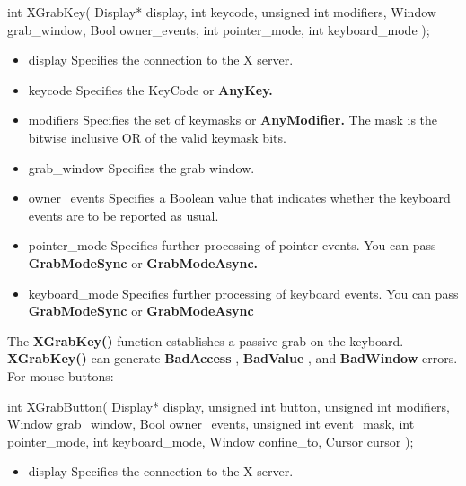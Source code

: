 \documentclass{report}
\begin{document}
\begin{itemize}
\begin{cppcode}
                int XGrabKey(
                    Display* display,
                    int keycode,
                    unsigned int modifiers,
                    Window grab_window,
                    Bool owner_events,
                    int pointer_mode,
                    int keyboard_mode
                );
            \end{cppcode}
            \begin{itemize}
                \item display	Specifies the connection to the X server.
                \item keycode	Specifies the KeyCode or \textbf{AnyKey.}
                \item modifiers	Specifies the set of keymasks or \textbf{AnyModifier.} The mask is the bitwise inclusive OR of the valid keymask bits.
                \item grab\_window	Specifies the grab window.
                \item owner\_events	Specifies a Boolean value that indicates whether the keyboard events are to be reported as usual.
                \item pointer\_mode	Specifies further processing of pointer events. You can pass \textbf{GrabModeSync} or \textbf{GrabModeAsync.}
                \item keyboard\_mode	Specifies further processing of keyboard events. You can pass \textbf{GrabModeSync} or \textbf{GrabModeAsync}
            \end{itemize}
            The \textbf{XGrabKey()} function establishes a passive grab on the keyboard. \textbf{XGrabKey()} can generate \textbf{BadAccess} , \textbf{BadValue} , and \textbf{BadWindow} errors.
            \bigbreak \noindent 
            For mouse buttons:
            \bigbreak \noindent 
            \begin{cppcode}
                int XGrabButton(
                    Display* display,
                    unsigned int button,
                    unsigned int modifiers,
                    Window grab_window,
                    Bool owner_events,
                    unsigned int event_mask,
                    int pointer_mode,
                    int keyboard_mode,
                    Window confine_to,
                    Cursor cursor
                );
            \end{cppcode}
            \begin{itemize}
                \item display	Specifies the connection to the X server.

\end{itemize}
\end{itemize}
\end{document}
